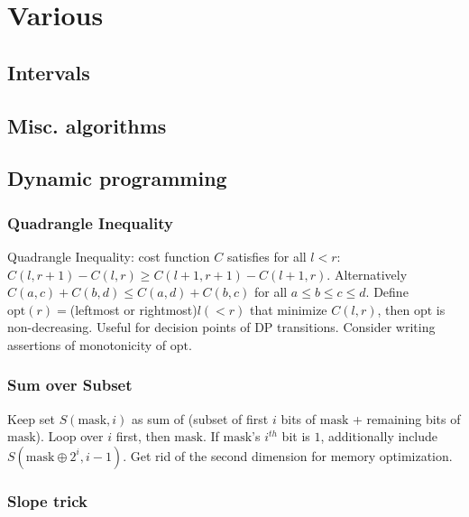 \chapter{Various}

\section{Intervals}

\section{Misc. algorithms}

\section{Dynamic programming}
	\subsection{Quadrangle Inequality}
		Quadrangle Inequality: cost function $C$ satisfies for all $l < r$: $C(l,r+1)-C(l, r) \ge C(l+1,r+1) - C(l+1,r)$.
		Alternatively $C(a,c) + C(b,d) \le C(a,d) + C(b,c)$ for all $a \le b \le c \le d$.
		Define $\text{opt}(r)=$(leftmost or rightmost)$l(< r)$ that minimize $C(l,r)$, then $\text{opt}$ is non-decreasing.
		Useful for decision points of DP transitions. Consider writing assertions of monotonicity of $\text{opt}$.


\columnbreak

	\subsection{Sum over Subset}

		Keep set $S(\text{mask}, i)$ as sum of (subset of first $i$ bits of $\text{mask}$ + remaining bits of $\text{mask}$).
		Loop over $i$ first, then $\text{mask}$. If $\text{mask}$'s $i^{th}$ bit is $1$, 
		additionally include $S(\text{mask} \oplus 2^i, i-1)$.
		Get rid of the second dimension for memory optimization.

	\subsection{Slope trick}

